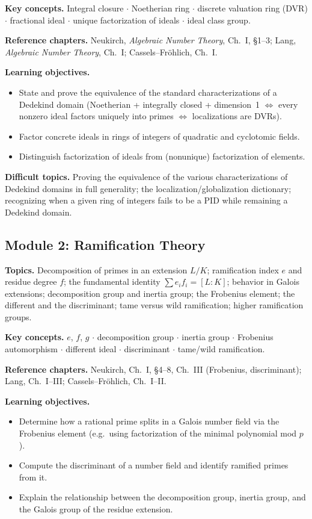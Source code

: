 \documentclass[11pt]{article}
\begin{document}
\textbf{Key concepts.} Integral closure $\cdot$ Noetherian ring $\cdot$ discrete valuation ring (DVR) $\cdot$ fractional ideal $\cdot$ unique factorization of ideals $\cdot$ ideal class group.

\textbf{Reference chapters.} Neukirch, \emph{Algebraic Number Theory}, Ch.~I, \S1--3; Lang, \emph{Algebraic Number Theory}, Ch.~I; Cassels--Fröhlich, Ch.~I.

\textbf{Learning objectives.}
\begin{itemize}[leftmargin=*]
  \item State and prove the equivalence of the standard characterizations of a Dedekind domain (Noetherian + integrally closed + dimension~1 $\iff$ every nonzero ideal factors uniquely into primes $\iff$ localizations are DVRs).
  \item Factor concrete ideals in rings of integers of quadratic and cyclotomic fields.
  \item Distinguish factorization of ideals from (nonunique) factorization of elements.
\end{itemize}

\textbf{Difficult topics.} Proving the equivalence of the various characterizations of Dedekind domains in full generality; the localization/globalization dictionary; recognizing when a given ring of integers fails to be a PID while remaining a Dedekind domain.

\subsection*{Module 2: Ramification Theory}
\textbf{Topics.} Decomposition of primes in an extension $L/K$; ramification index $e$ and residue degree $f$; the fundamental identity $\sum e_i f_i = [L:K]$; behavior in Galois extensions; decomposition group and inertia group; the Frobenius element; the different and the discriminant; tame versus wild ramification; higher ramification groups.

\textbf{Key concepts.} $e$, $f$, $g$ $\cdot$ decomposition group $\cdot$ inertia group $\cdot$ Frobenius automorphism $\cdot$ different ideal $\cdot$ discriminant $\cdot$ tame/wild ramification.

\textbf{Reference chapters.} Neukirch, Ch.~I, \S4--8, Ch.~III (Frobenius, discriminant); Lang, Ch.~I--III; Cassels--Fröhlich, Ch.~I--II.

\textbf{Learning objectives.}
\begin{itemize}[leftmargin=*]
  \item Determine how a rational prime splits in a Galois number field via the Frobenius element (e.g.\ using factorization of the minimal polynomial mod $p$).
  \item Compute the discriminant of a number field and identify ramified primes from it.
  \item Explain the relationship between the decomposition group, inertia group, and the Galois group of the residue extension.
\end{itemize}
\end{document}
